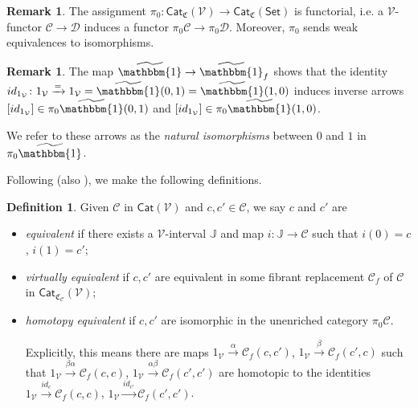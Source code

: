\documentclass[a4paper,10pt
,draft
]{article}%
\numberwithin{equation}{section}
\numberwithin{figure}{section}
\theoremstyle{definition} %
\newtheorem{definition}[equation]{Definition}%
\newtheorem{remark}[equation]{Remark}%
\newcommand{\Cat}{\mathsf{Cat}}
\newcommand{\V}{\ensuremath{\mathcal V}}
\newcommand{\1}{\ensuremath{\mathbbm 1}}%
\begin{document}
\begin{remark}
      The assignment
      $\pi_0\colon \mathsf{Cat}_{\mathfrak{C}}(\V)
\to \mathsf{Cat}_{\mathfrak{C}}(\mathsf{Set})$ is functorial,
i.e. a $\V$-functor
$\mathcal{C} \to \mathcal{D}$
induces a functor 
$\pi_0\mathcal{C} \to \pi_0\mathcal{D}$.
Moreover, $\pi_0$ sends weak equivalences to isomorphisms.
\end{remark}



\begin{remark}\label{NATISO REM}
The map $\widetilde{\mathbbm{1}} \to \widetilde{\mathbbm{1}}_f$
shows that the identity
$id_{1_{\V}}\colon 1_{\V} \xrightarrow{=} 1_{\V} = \widetilde{\mathbbm{1}}(0,1) = \widetilde{\mathbbm{1}}(1,0)$
induces inverse arrows
$[id_{1_{\V}}] \in \pi_0 \widetilde{\mathbbm{1}}(0,1)$
and
$[id_{1_{\V}}] \in \pi_0 \widetilde{\mathbbm{1}}(1,0)$.

We refer to these arrows as the
\emph{natural isomorphisms} between $0$ and $1$ in $\pi_0 \widetilde{\mathbbm{1}}$.
\end{remark}




Following \cite[Def. 2.6]{BM13} (also \cite{Cav}),
we make the following definitions.

\begin{definition}\label{EQUIV_DEF}
	Given $\mathcal{C}$ in  $\Cat(\V)$ and $c,c'\in \mathcal C$, we say $c$ and $c'$ are
\begin{itemize}
	\item {\em equivalent} if there exists a $\V$-interval $\mathbb{J}$
	and map $i: \mathbb{J} \to \mathcal C$ such that
	$i(0)= c$, $i(1)= c'$;
	\item {\em virtually equivalent} if $c,c'$ are equivalent in some fibrant replacement
	$\mathcal C_f$ of $\mathcal C$ in $\Cat_{\mathfrak{C}_{\mathcal{C}}}(\V)$;
	\item {\em homotopy equivalent} if $c,c'$ are isomorphic in the unenriched category $\pi_0 \mathcal C$.

	Explicitly, this means there are maps 
	$1_\V \xrightarrow{\alpha} \mathcal C_f(c,c')$, 
	$1_\V \xrightarrow{\beta} \mathcal C_f(c',c)$ such that
	$1_{\V} \xrightarrow{\beta \alpha} \mathcal C_f(c,c)$,
	$1_{\V} \xrightarrow{\alpha \beta} \mathcal C_f(c',c')$
	are homotopic to the identities
	$1_{\V} \xrightarrow{id_c} \mathcal C_f(c,c)$,
	$1_{\V} \xrightarrow{id_{c'}} \mathcal C_f(c',c')$.
\end{itemize}
\end{definition}
\end{document}
